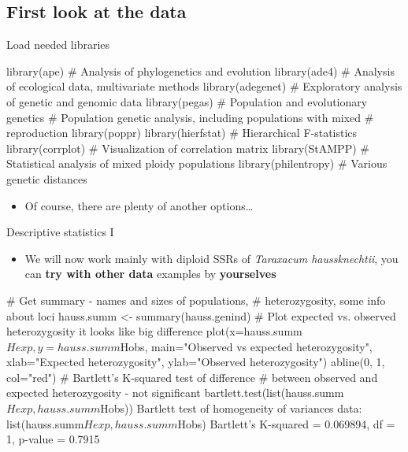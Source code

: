 \documentclass[compress, ucs, xelatex, 11pt, xcolor=svgnames, aspectratio=169,
	hyperref={
		bookmarks=true,
		unicode=true,
		colorlinks=true,
		pdftitle={Molecular data in R},
		plainpages=false,
		pdfauthor={Vojtech Zeisek},
		pdfsubject={Course about phylogeny and evolution in R},
		pdfcreator={XeLaTeX},
		pdfkeywords={R, evolution, phylogeny, molecular data},
		linkcolor=Crimson, %
		anchorcolor=Magenta, %
		citecolor=Magenta, %
		filecolor=Magenta, %
		menucolor=Magenta, %
		urlcolor=DodgerBlue, %
		pdftex},
	url={hyphens, lowtilde} %
	]{beamer}
\begin{document}
\subsection{First look at the data}

\begin{frame}[fragile]{Load needed libraries}
	\begin{spluscode}
    library(ape) # Analysis of phylogenetics and evolution
    library(ade4) # Analysis of ecological data, multivariate methods
    library(adegenet) # Exploratory analysis of genetic and genomic data
    library(pegas) # Population and evolutionary genetics
    # Population genetic analysis, including populations with mixed
    # reproduction
    library(poppr)
    library(hierfstat) # Hierarchical F-statistics
    library(corrplot) # Visualization of correlation matrix
    library(StAMPP) # Statistical analysis of mixed ploidy populations
    library(philentropy) # Various genetic distances
	\end{spluscode}
	\begin{itemize}
		\item Of course, there are plenty of another options\ldots
	\end{itemize}
\end{frame}

\begin{frame}[fragile]{Descriptive statistics I}
	\label{popgenindx}
	\begin{itemize}
		\item We will now work mainly with diploid SSRs of \textit{Taraxacum haussknechtii}, you can \textbf{try with other data} examples by \textbf{yourselves}
	\end{itemize}
	\begin{spluscode}
    # Get summary - names and sizes of populations,
    # heterozygosity, some info about loci
    hauss.summ <- summary(hauss.genind)
    # Plot expected vs. observed heterozygosity it looks like big difference
    plot(x=hauss.summ$Hexp, y=hauss.summ$Hobs,
      main="Observed vs expected heterozygosity",
      xlab="Expected heterozygosity", ylab="Observed heterozygosity")
    abline(0, 1, col="red")
    # Bartlett's K-squared test of difference
    # between observed and expected heterozygosity - not significant
    bartlett.test(list(hauss.summ$Hexp, hauss.summ$Hobs))
                  Bartlett test of homogeneity of variances
    data:  list(hauss.summ$Hexp, hauss.summ$Hobs)
    Bartlett's K-squared = 0.069894, df = 1, p-value = 0.7915
	\end{spluscode}
\end{frame}
\end{document}
